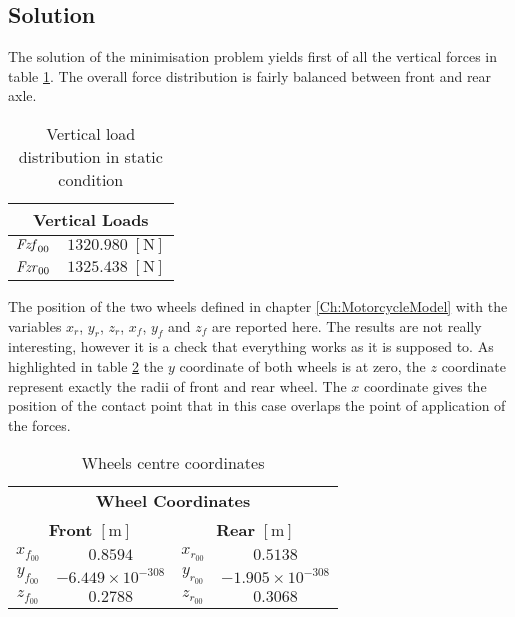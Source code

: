 \subsection{Solution}
%
The solution of the minimisation problem yields first of all the vertical forces in table \ref{tab:vertforce}. The overall force distribution is fairly balanced between front and rear axle.

%
\begin{table}[h!]
    \centering
    \begin{tabular}{@{}cc@{}}
    \toprule
    \multicolumn{2}{c}{\textbf{Vertical Loads}} \\ \midrule
    ${\it Fzf}_{00}$  & $1320.980 \; [\si{\newton}]$ \\
    ${\it Fzr}_{00}$  & $1325.438 \; [\si{\newton}]$ \\ \bottomrule
    \end{tabular}
    \caption{Vertical load distribution in static condition}
    \label{tab:vertforce}
\end{table}
%

The position of the two wheels defined in chapter \ref{Ch:MotorcycleModel} with the variables $x_r$, $y_r$, $z_r$, $x_f$, $y_f$ and $z_f$ are reported here. The results are not really interesting, however it is a check that everything works as it is supposed to. As highlighted in table \ref{tab:wheelcoordinates} the $y$ coordinate of both wheels is at zero, the $z$ coordinate represent exactly the radii of front and rear wheel. The $x$ coordinate gives the position of the contact point that in this case overlaps the point of application of the forces.

%
\begin{table}[h!]
    \centering
    \begin{tabular}{@{}cccc@{}}
    \toprule
    \multicolumn{4}{c}{\textbf{Wheel Coordinates}}                         \\
    \multicolumn{2}{c}{\textbf{Front} $[\si{\metre}]$} & \multicolumn{2}{c}{\textbf{Rear} $[\si{\metre}]$} \\ \midrule
    $x_{f_{00}}$  &  $ 0.8594                  $ & $x_{r_{00}}$  &  $ 0.5138                  $ \\     
    $y_{f_{00}}$  &  $-{ 6.449\times 10^{-308}}$ & $y_{r_{00}}$  &  $-{ 1.905\times 10^{-308}}$ \\  
    $z_{f_{00}}$  &  $ 0.2788                  $ & $z_{r_{00}}$  &  $ 0.3068                  $ \\ \bottomrule
    \end{tabular}
    \caption{Wheels centre coordinates}
    \label{tab:wheelcoordinates}
\end{table}
%

